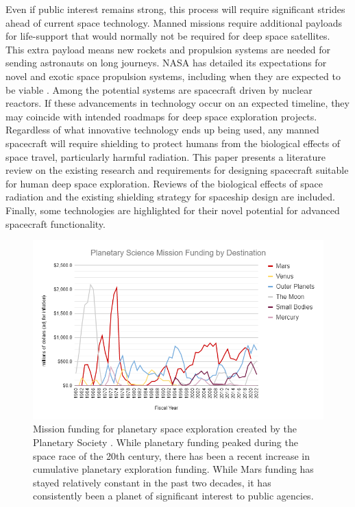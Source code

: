 Even if public interest remains strong, this process will require significant strides ahead of current space technology. Manned missions require additional payloads for life-support that would normally not be required for deep space satellites. This extra payload means new rockets and propulsion systems are needed for sending astronauts on long journeys. NASA has detailed its expectations for novel and exotic space propulsion systems, including when they are expected to be viable \cite{nasa-propulsion}. Among the potential systems are spacecraft driven by nuclear reactors. If these advancements in technology occur on an expected timeline, they may coincide with intended roadmaps for deep space exploration projects. Regardless of what innovative technology ends up being used, any manned spacecraft will require shielding to protect humans from the biological effects of space travel, particularly harmful radiation. This paper presents a literature review on the existing research and requirements for designing spacecraft suitable for human deep space exploration. Reviews of the biological effects of space radiation and the existing shielding strategy for spaceship design are included. Finally, some technologies are highlighted for their novel potential for advanced spacecraft functionality.

\begin{figure}
\centering
\includegraphics[width=\linewidth]{mars-budget.png}
\caption{Mission funding for planetary space exploration created by the Planetary Society \cite{planetary-society}. While planetary funding peaked during the space race of the 20th century, there has been a recent increase in cumulative planetary exploration funding. While Mars funding has stayed relatively constant in the past two decades, it has consistently been a planet of significant interest to public agencies.}
\label{fig:budget}
\end{figure}
